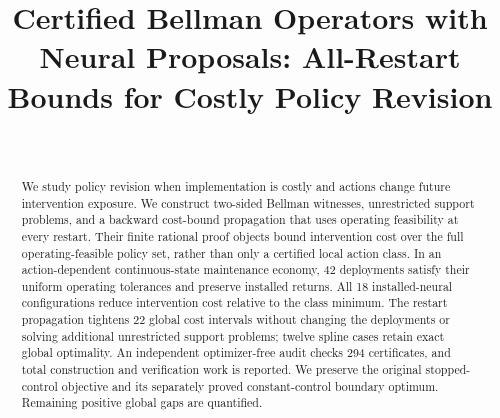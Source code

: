 
\begin{frontmatter}
\title{Certified Bellman Operators with Neural Proposals: All-Restart Bounds for Costly Policy Revision}
\begin{aug}\author[id=au1,addressref={add1}]{~}\address[id=add1]{}\end{aug}
\begin{abstract}We study policy revision when implementation is costly and actions change future intervention exposure. We construct two-sided Bellman witnesses, unrestricted support problems, and a backward cost-bound propagation that uses operating feasibility at every restart. Their finite rational proof objects bound intervention cost over the full operating-feasible policy set, rather than only a certified local action class. In an action-dependent continuous-state maintenance economy, 42 deployments satisfy their uniform operating tolerances and preserve installed returns. All 18 installed-neural configurations reduce intervention cost relative to the class minimum. The restart propagation tightens 22 global cost intervals without changing the deployments or solving additional unrestricted support problems; twelve spline cases retain exact global optimality. An independent optimizer-free audit checks 294 certificates, and total construction and verification work is reported. We preserve the original stopped-control objective and its separately proved constant-control boundary optimum. Remaining positive global gaps are quantified.\end{abstract}
\begin{keyword}\end{keyword}
\end{frontmatter}

\clearpage

